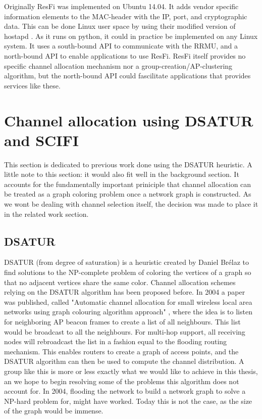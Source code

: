 Originally ResFi was implemented on Ubuntu 14.04. It adds vendor specific information elements to the MAC-header with the IP, port, and cryptographic data. This can be done Linux user space by using their modified version of hostapd \cite{resfigit}.
As it runs on python, it could in practice be implemented on any Linux system. It uses a south-bound API to communicate with the RRMU, and a north-bound API to enable applications to use ResFi. ResFi itself provides no specific channel allocation mechanism nor a group-creation/AP-clustering algorithm, but the north-bound API could fascilitate applications that provides services like these.


\section{Channel allocation using DSATUR and SCIFI} 
This section is dedicated to previous work done using the DSATUR heuristic. A little note to this section: it would also fit well in the background section. It accounts for the fundamentally important priniciple that
channel allocation can be treated as a graph coloring problem once a network graph is constructed. As we wont be dealing with channel selection itself, the decision was made to place it in the related work section.  

\subsection{DSATUR}
DSATUR (from degree of saturation) is a heuristic created by Daniel Brélaz \cite{Brelaz} to find solutions to the NP-complete problem of coloring the vertices of a graph so that no adjacent vertices share the same color. 
Channel allocation schemes relying on the DSATUR algorithm has been proposed before. In 2004 a paper was published, called
"Automatic channel allocation for small wireless local area networks using graph colouring algorithm approach" \cite{mahonen}, where the idea is to listen for neighboring AP beacon frames to create a list of all neighbours.
This list would be broadcast to all the neighbours. For multi-hop support, all receiving nodes will rebroadcast the list in a fashion equal to the flooding routing mechanism. This enables routers to create a graph of access points, and the DSATUR algorithm can then be used to compute the channel distribution. A group like this is more or less exactly what we would like to achieve in this thesis, 
an we hope to begin resolving some of the problems this algorithm does not account for. In 2004, flooding the network to build a network graph to solve a NP-hard problem for, might have worked. Today this is not the case, as the size of the graph would be immense. 

